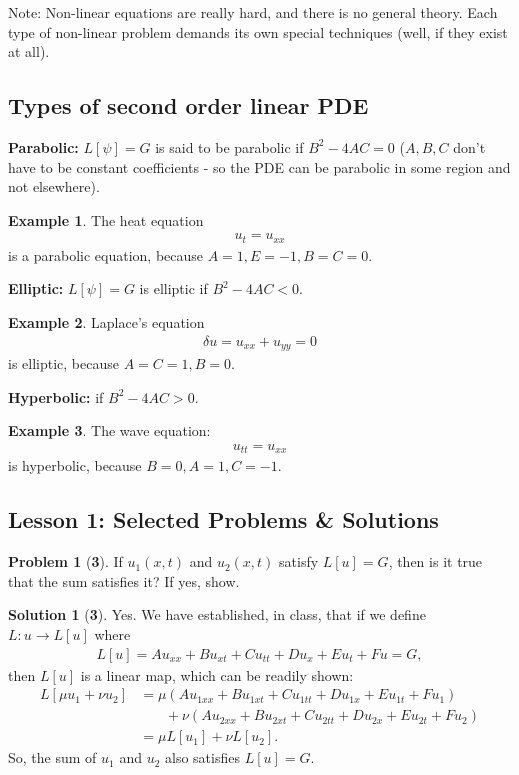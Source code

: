 \documentclass{article}
\theoremstyle{definition}
\newtheorem{exmp}{Example}[section]
\newtheorem*{prob*}{Problem}
\newtheorem*{sln*}{Solution}
\begin{document}
Note: Non-linear equations are really hard, and there is no general theory. Each type of non-linear problem demands its own special techniques (well, if they exist at all). 

\subsection{Types of second order linear PDE}
\textbf{Parabolic:} $L[\psi] = G$ is said to be parabolic if $B^2 - 4AC = 0$ ($A,B,C$ don't have to be constant coefficients - so the PDE can be parabolic in some region and not elsewhere). 
\begin{exmp}
	The heat equation
	\begin{align*}
	u_t = u_{xx}
	\end{align*}
	is a parabolic equation, because $A=1, E=-1, B=C=0$. 
\end{exmp}

\textbf{Elliptic:} $L[\psi] = G$ is elliptic if $B^2 - 4AC < 0$.
\begin{exmp}
	Laplace's equation
	\begin{align*}
	\delta u = u_{xx} + u_{yy} = 0
	\end{align*}
	is elliptic, because $A=C=1, B=0$.
\end{exmp}

\textbf{Hyperbolic: } if $B^2 - 4AC > 0$.
\begin{exmp}
	The wave equation:\begin{align*}
	u_{tt} = u_{xx}
	\end{align*}
	is hyperbolic, because $B=0, A=1, C=-1$.
\end{exmp}

\newpage

\subsection{Lesson 1: Selected Problems \& Solutions}
\begin{prob*}[\textbf{3}]
	If $u_1(x,t)$ and $u_2(x,t)$ satisfy $L[u] = G$, then is it true that the sum satisfies it? If yes, show.
	\begin{sln*}[\textbf{3}]
		Yes. We have established, in class, that if we define $L : u \rightarrow L[u]$ where  
		\begin{align*}
		L[u] = Au_{xx} + Bu_{xt} + Cu_{tt} + Du_x + Eu_t + Fu = G,
		\end{align*}
		then $L[u]$ is a linear map, which can be readily shown:
		\begin{align*}
		L[\mu u_1 + \nu u_2 ] &= \mu(Au_{1xx} + Bu_{1xt} + Cu_{1tt} + Du_{1x} + Eu_{1t} + Fu_1) \\
		&\text{ }\,\,\,\,\,\,\,+\nu(Au_{2xx} + Bu_{2xt} + Cu_{2tt} + Du_{2x} + Eu_{2t} + Fu_2)\\
		&= \mu L[u_1] + \nu L[u_2].
		\end{align*}
		So, the sum of $u_1$ and $u_2$ also satisfies $L[u] = G$.
	\end{sln*}
\end{prob*}
\end{document}
